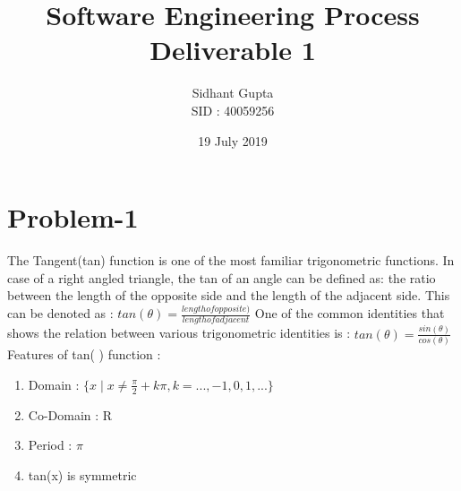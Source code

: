 \documentclass[12pt]{article}
\title{ \centering Software Engineering Process \\ Deliverable 1}
\author{Sidhant Gupta \\ SID : 40059256}
\date{19 July 2019}
\begin{document}
\maketitle
\newpage
\section{Problem-1}

The Tangent(tan) function is one of the most familiar trigonometric functions. 
\newline
In case of a right angled triangle, the tan of an angle can be defined as: the ratio between the length of the opposite side and the length of the adjacent side. This can be denoted as  :
\newline
\newline
$tan( \theta ) = \frac{length of opposite)}{length of adjacent }$
\newline
\newline
One of the common identities that shows the relation between various trigonometric identities is :
\newline
\newline
$tan(\theta) = \frac{ sin(\theta)}{cos(\theta) }$
\newline
\newline
Features of tan( ) function :
\newline
\begin{enumerate}
\item Domain : $ \{x\mid x \neq \frac{\pi}{2} + k\pi , k= ...,-1,0,1,...   \}$
\item Co-Domain : R
\item Period : $\pi $
\item tan(x) is symmetric 
\end{enumerate}
\newpage
\end{document}
